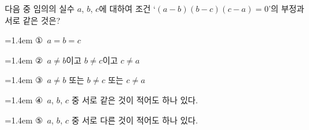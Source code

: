 다음 중 임의의 실수 $a$, $b$, $c$에 대하여 조건 `$(a-b)(b-c)(c-a)=0$'의 부정과 서로 같은 것은?
\par\medskip\par\noindent\hangindent=1.4em {\small ①}\ $a=b=c$\par\noindent\hangindent=1.4em {\small ②}\ $a\ne b$이고 $b\ne c$이고 $c\ne a$\par\noindent\hangindent=1.4em {\small ③}\ $a\ne b$ 또는 $b\ne c$ 또는 $c\ne a$\par\noindent\hangindent=1.4em {\small ④}\ $a$, $b$, $c$ 중 서로 같은 것이 적어도 하나 있다.\par\noindent\hangindent=1.4em {\small ⑤}\ $a$, $b$, $c$ 중 서로 다른 것이 적어도 하나 있다.\par\medskip
